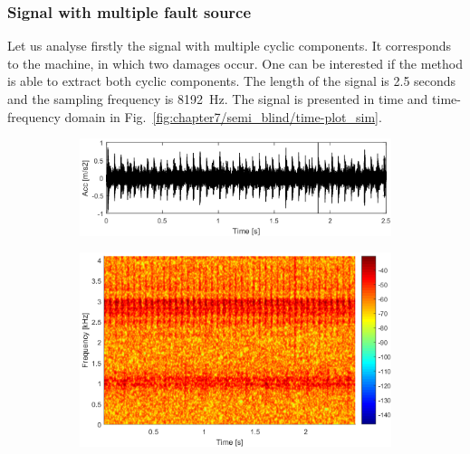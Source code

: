 \subsubsection{Signal with multiple fault source}
\label{sec:chapter7/semi_blind/schemat_przekladniamultiple source_semi_blind}
Let us analyse firstly the signal with multiple cyclic components. It corresponds to the machine, in which two damages occur. One can be interested if the method is able to extract both cyclic components.
The length of the signal is 2.5 seconds and the sampling frequency is  8192~Hz. The signal is presented in time and time-frequency domain in Fig.~\ref{fig:chapter7/semi_blind/time-plot_sim}.
\begin{figure}[!ht]
    \centering
    \begin{subfigure}[b]{0.8\textwidth}
        \centering
        \captionsetup{skip=0.01pt}
         \caption{}
        \includegraphics[width=\textwidth]{wykresy/chapter_application/semi_blind/sygnal_simulated.png}
    \end{subfigure}
    \begin{subfigure}[b]{0.7\textwidth}
        \centering
        \captionsetup{skip=0.01pt}
         \caption{}
        \includegraphics[width=\textwidth]{wykresy/chapter_application/semi_blind/spectrogram_simulated.png}

\end{subfigure}
\end{figure}
